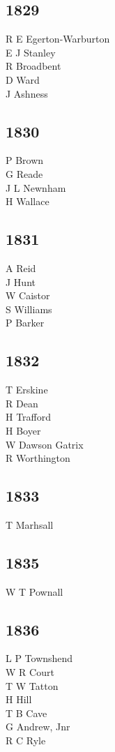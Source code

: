 \begin{multicols}{3}
  \subsection*{1829}
  R E Egerton-Warburton \\
  E J Stanley \\
  R Broadbent \\
  D Ward \\
  J Ashness \\
  \subsection*{1830}
  P Brown \\
  G Reade \\
  J L Newnham \\
  H Wallace \\
  \subsection*{1831}
  A Reid \\
  J Hunt \\
  W Caistor \\
  S Williams \\
  P Barker \\
  \subsection*{1832}
  T Erskine \\
  R Dean \\
  H Trafford \\
  H Boyer \\
  W Dawson Gatrix \\
  R Worthington \\
  \subsection*{1833}
  T Marhsall \\
  \subsection*{1835}
  W T Pownall \\
  \subsection*{1836}
  L P Townshend \\
  W R Court \\
  T W Tatton \\
  H Hill \\
  T B Cave \\
  G Andrew, Jnr \\
  R C Ryle \\

\end{multicols}
